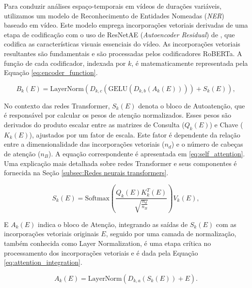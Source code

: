Para conduzir análises espaço-temporais em vídeos de durações variáveis, utilizamos um modelo de Reconhecimento de Entidades Nomeadas (\textit{NER}) baseado em vídeo. Este modelo emprega incorporações vetoriais derivadas de uma etapa de codificação com o uso de ResNetAE (\textit{Autoencoder Residual}) de \textcite{ResNetAE}, que codifica as características visuais essenciais do vídeo. As incorporações vetoriais resultantes são fundamentais e são processadas pelos codificadores RoBERTa. A função de cada codificador, indexada por \(k\), é matematicamente representada pela Equação \ref{eq:encoder_function}.

\begin{equation}
B_k(E) = \text{LayerNorm}\left(D_{k,c}\left(\text{GELU}\left(D_{k,b}\left(A_k(E)\right)\right)\right) + S_k(E)\right),
\label{eq:encoder_function}
\end{equation}

No contexto das redes Transformer, \(S_k(E)\) denota o bloco de Autoatenção, que é responsável por calcular os pesos de atenção normalizados. Esses pesos são derivados do produto escalar entre as matrizes de Consulta (\(Q_k(E)\)) e Chave (\(K_k(E)\)), ajustados por um fator de escala. Este fator é dependente da relação entre a dimensionalidade das incorporações vetoriais (\(n_d\)) e o número de cabeças de atenção (\(n_B\)). A equação correspondente é apresentada em \ref{eq:self_attention}. Uma explicação mais detalhada sobre redes Transformer e seus componentes é fornecida na Seção \ref{subsec:Redes neurais transformers}.



\begin{equation}
S_k(E) = \text{Softmax}\left(\frac{Q_k(E)K_k^T(E)}{\sqrt{\frac{n_d}{n_B}}}\right)V_k(E),
\label{eq:self_attention}
\end{equation}


E \(A_k(E)\) indica o bloco de Atenção, integrando as saídas de \(S_k(E)\) com as incorporações vetoriais originais \(E\), seguido por uma camada de normalização, também conhecida como Layer Normalization, é uma etapa crítica no processamento dos incorporações vetoriais e é dada pela Equação \ref{eq:attention_integration}.

\begin{equation}
A_k(E) = \text{LayerNorm}\left(D_{k,a}\left(S_k(E)\right) + E\right).
\label{eq:attention_integration}
\end{equation}

